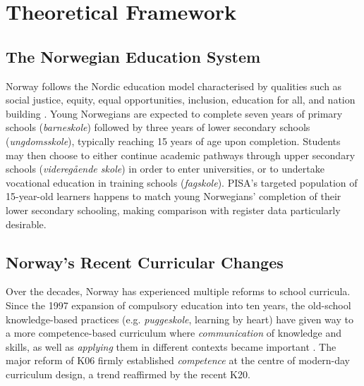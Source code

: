 \documentclass[
    a4paper,                %
    11pt,                   %
    stu,                    %
    donotrepeattitle,       %
    floatsintext,           %
    biblatex,               %
    colorlinks=true,        %
    linkcolor=red,          %
    anchorcolor=black,      %
    citecolor=blue,         %
    urlcolor=blue,          %
    bookmarks=true,         %
    bookmarksopen=false,    %
    bookmarksnumbered=true, %
    dvipsnames              %
]{apa7}
\begin{document}
\section{Theoretical Framework}


\subsection{The Norwegian Education System}

Norway follows the Nordic education model characterised by qualities such as social justice, equity, equal opportunities, inclusion, education for all, and nation building \parencite{imsen:2017}. Young Norwegians are expected to complete seven years of primary schools (\textit{barneskole}) followed by three years of lower secondary schools (\textit{ungdomsskole}), typically reaching 15 years of age upon completion. Students may then choose to either continue academic pathways through upper secondary schools (\textit{videreg{\aa}ende skole}) in order to enter universities, or to undertake vocational education in training schools (\textit{fagskole}). PISA's targeted population of 15-year-old learners happens to match young Norwegians' completion of their lower secondary schooling, making comparison with register data particularly desirable.

\subsection{Norway's Recent Curricular Changes}

Over the decades, Norway has experienced multiple reforms to school curricula. Since the 1997 expansion of compulsory education into ten years, the old-school knowledge-based practices (e.g. \textit{puggeskole}, learning by heart) have given way to a more competence-based curriculum where \emph{communication} of knowledge and skills, as well as \emph{applying} them in different contexts became important \parencite{imsen:2017}. The major reform of K06 firmly established \emph{competence} at the centre of modern-day curriculum design, a trend reaffirmed by the recent K20.
\end{document}
